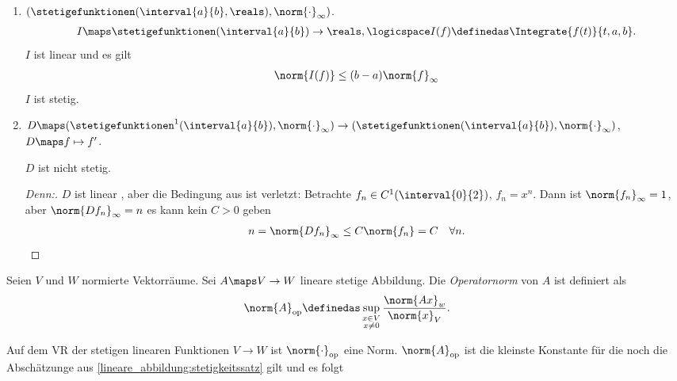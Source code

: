 \begin{beispiele*}
    \begin{enumerate}
        \item \( (\stetigefunktionen(\interval{a}{b},\reals),\norm{\cdot}_{\infty}) \).
        \begin{align*}
            I\maps \stetigefunktionen(\interval{a}{b})\to \reals,\logicspace I(f)\definedas \Integrate{f(t)}{t,a,b}.
        \end{align*}
        \( I \) ist linear und es gilt
        \begin{align*}
            \norm{I(f)}\leq (b-a)\norm{f}_{\infty}
        \end{align*}
        \timplies \( I \) ist stetig.
        \item \( D\maps (\stetigefunktionen^1(\interval{a}{b}),\norm{\cdot}_{\infty})\to (\stetigefunktionen(\interval{a}{b}),\norm{\cdot}_{\infty}) \), \( D\maps f\mapsto f' \).
        \begin{behauptung*}
            \( D \) ist nicht stetig.
        \end{behauptung*}
        \begin{proof}[Denn:]
            \( D \) ist linear \checkmark, aber die Bedingung aus  ist verletzt: Betrachte \( f_n\in C^1(\interval{0}{2}) \), \( f_n=x^n    \).
            Dann ist \( \norm{f_n}_{\infty}=1 \), aber \( \norm{Df_n}_{\infty}=n \) \timplies es kann kein \( C>0 \) geben \sd
            \begin{align*}
                n=\norm{Df_n}_{\infty}\leq C\norm{f_n}=C\quad \forall n.
            \end{align*}
        \end{proof}
    \end{enumerate}
\end{beispiele*}
\begin{definition*}
    Seien \( V \) und \( W \) normierte Vektorräume.
    Sei \( A\maps V\to W \) lineare stetige Abbildung.
    Die \emph{Operatornorm} von \( A \) ist definiert als
    \begin{align*}
        \norm{A}_{\text{op}}\definedas \sup_{\substack{x\in V\\ x\neq 0}}\frac{\norm{Ax}_{w}}{\norm{x}_{V}}.
    \end{align*}
\end{definition*}
    Auf dem VR der stetigen linearen Funktionen \( V\to W \) ist \( \norm{\cdot}_{\text{op}} \) eine Norm.
    \( \norm{A}_{\text{op}} \) ist die kleinste Konstante für die noch die Abschätzunge aus \ref{lineare_abbildung:stetigkeitssatz} gilt und es folgt
